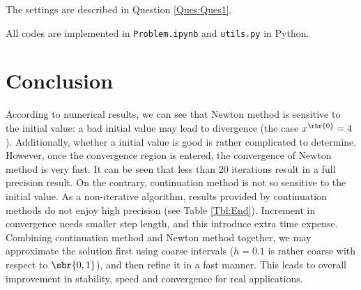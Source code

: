 \documentclass[english, nochinese]{pkupaper}
\begin{document}
The settings are described in Question \ref{Ques:Ques1}.

All codes are implemented in \verb"Problem.ipynb" and \verb"utils.py" in Python.

\section{Conclusion}

According to numerical results, we can see that Newton method is sensitive to the initial value: a bad initial value may lead to divergence (the case $ x^{\rbr{0}} = 4 $). Additionally, whether a initial value is good is rather complicated to determine. However, once the convergence region is entered, the convergence of Newton method is very fast. It can be seen that less than 20 iterations result in a full precision result. On the contrary, continuation method is not so sensitive to the initial value. As a non-iterative algorithm, results provided by continuation methods do not enjoy high precision (see Table \ref{Tbl:End}). Increment in convergence needs smaller step length, and this introduce extra time expense. Combining continuation method and Newton method together, we may approximate the solution first using coarse intervals ($ h = 0.1 $ is rather coarse with respect to $ \sbr{ 0, 1 } $), and then refine it in a fast manner. This leads to overall improvement in stability, speed and convergence for real applications.
\end{document}
